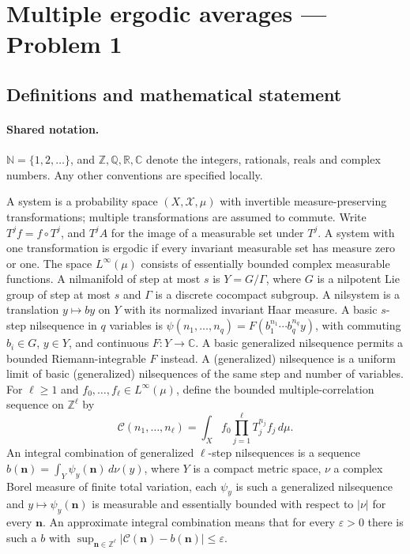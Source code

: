\documentclass[11pt]{article}
\begin{document}
\section{Multiple ergodic averages — Problem 1}\label{statement}

\subsection{Definitions and mathematical statement}

\paragraph{Shared notation.}$\mathbb N=\{1,2,\ldots\}$, and $\mathbb Z,\mathbb Q,\mathbb R,\mathbb C$ denote the integers, rationals, reals and complex numbers. Any other conventions are specified locally.


A system is a probability space $(X,\mathcal X,\mu)$ with invertible measure-preserving transformations; multiple transformations are assumed to commute. Write $T^j f=f\circ T^j$, and $T^j A$ for the image of a measurable set under $T^j$. A system with one transformation is ergodic if every invariant measurable set has measure zero or one. The space $L^\infty(\mu)$ consists of essentially bounded complex measurable functions. A nilmanifold of step at most $s$ is $Y=G/\Gamma$, where $G$ is a nilpotent Lie group of step at most $s$ and $\Gamma$ is a discrete cocompact subgroup. A nilsystem is a translation $y\mapsto by$ on $Y$ with its normalized invariant Haar measure. A basic $s$-step nilsequence in $q$ variables is $\psi(n_1,\ldots,n_q)=F(b_1^{n_1}\cdots b_q^{n_q}y)$, with commuting $b_i\in G$, $y\in Y$, and continuous $F:Y\to\mathbb C$. A basic generalized nilsequence permits a bounded Riemann-integrable $F$ instead. A (generalized) nilsequence is a uniform limit of basic (generalized) nilsequences of the same step and number of variables. For $\ell\ge1$ and $f_0,\ldots,f_\ell\in L^\infty(\mu)$, define the bounded multiple-correlation sequence on $\mathbb Z^\ell$ by \[\mathcal C(n_1,\ldots,n_\ell)=\int_X f_0\prod_{j=1}^\ell T_j^{n_j}f_j\,d\mu.\] An integral combination of generalized $\ell$-step nilsequences is a sequence $b(\mathbf n)=\int_Y\psi_y(\mathbf n)\,d\nu(y)$, where $Y$ is a compact metric space, $\nu$ a complex Borel measure of finite total variation, each $\psi_y$ is such a generalized nilsequence and $y\mapsto\psi_y(\mathbf n)$ is measurable and essentially bounded with respect to $|\nu|$ for every $\mathbf n$. An approximate integral combination means that for every $\varepsilon>0$ there is such a $b$ with $\sup_{\mathbf n\in\mathbb Z^\ell}|\mathcal C(\mathbf n)-b(\mathbf n)|\le\varepsilon$.
\end{document}
